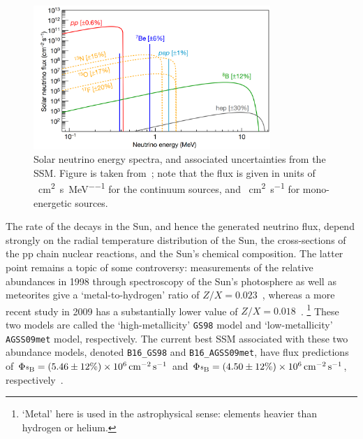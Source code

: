 \begin{figure}
    \centering
    \includegraphics[width=0.8\textwidth]{1_NeutrinoTheory/Figs/solar_nu_energy_spec_SSM.png}
    \caption[Solar neutrino energy spectrum, and associated uncertainties from the SMM]
    {Solar neutrino energy spectra, and associated uncertainties from the SSM. Figure is taken from~\cite{agostiniComprehensiveMeasurementPpchain2018,vinyolesB16StandardSolar2018}; note that the flux is given in units of \si{\per\cm\squared\per\second\per\MeV} for the continuum sources, and \si{\per\cm\squared\per\second} for mono-energetic sources.}
    \label{fig:ssm_neutrino_spectra}
\end{figure}

The rate of the \beight{} decays in the Sun, and hence the generated neutrino flux, depend strongly on the radial temperature distribution of the Sun, the cross-sections of the pp chain nuclear reactions, and the Sun's chemical composition. The latter point remains a topic of some controversy: measurements of the relative abundances in 1998 through spectroscopy of the Sun's photosphere as well as meteorites give a `metal-to-hydrogen' ratio of $Z/X = 0.023$~\cite{grevesseStandardSolarComposition1998}, whereas a more recent study in 2009 has a substantially lower value of $Z/X = 0.018$~\cite{asplundChemicalCompositionSun2009}.
\footnote{`Metal' here is used in the astrophysical sense: elements heavier than hydrogen or helium.} 
These two models are called the `high-metallicity' \texttt{GS98} model and `low-metallicity' \texttt{AGSS09met} model, respectively. The current best SSM associated with these two abundance models, denoted \texttt{B16\_GS98} and \texttt{B16\_AGSS09met}, have \beight{} flux predictions of $\Phi_{\beight{}} = (5.46\pm12\%)\times 10^{6}\,\si{\per\cm\squared\per\second}$ and $\Phi_{\beight{}} = (4.50\pm12\%)\times 10^{6}\,\si{\per\cm\squared\per\second}$, respectively~\cite{vinyolesB16StandardSolar2018}.

